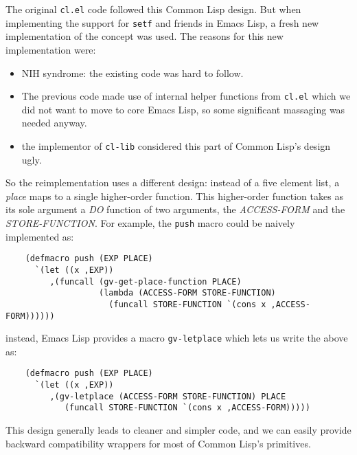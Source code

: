 \documentclass[format=acmsmall, review]{acmart}
\newcommand \Elisp {Emacs Lisp}
\begin{document}
The original \texttt{cl.el} code followed this Common Lisp design.  But when
implementing the support for \texttt{setf} and friends in \Elisp{}, a fresh
new implementation of the concept was used.  The reasons for this new
implementation were:
\begin{itemize}
\item NIH syndrome: the existing code was hard to follow.
\item The previous code made use of internal helper functions from
  \texttt{cl.el} which we did not want to move to core \Elisp, so some
  significant massaging was needed anyway.
\item the implementor of \texttt{cl-lib} considered this part of Common Lisp's
  design ugly.
\end{itemize}
So the reimplementation uses a different design: instead of a five element
list, a \emph{place} maps to a single higher-order function.
This higher-order function takes as its sole argument a \textsl{DO} function
of two arguments, the \textsl{ACCESS-FORM} and the \textsl{STORE-FUNCTION}.
For example, the \texttt{push} macro could be naively implemented as:
\begin{verbatim}
    (defmacro push (EXP PLACE)
      `(let ((x ,EXP))
         ,(funcall (gv-get-place-function PLACE)
                   (lambda (ACCESS-FORM STORE-FUNCTION)
                     (funcall STORE-FUNCTION `(cons x ,ACCESS-FORM))))))
\end{verbatim}
instead, \Elisp{} provides a macro \texttt{gv-letplace} which lets us
write the above as:
\begin{verbatim}
    (defmacro push (EXP PLACE)
      `(let ((x ,EXP))
         ,(gv-letplace (ACCESS-FORM STORE-FUNCTION) PLACE
            (funcall STORE-FUNCTION `(cons x ,ACCESS-FORM)))))
\end{verbatim}
This design generally leads to cleaner and simpler code, and we can easily
provide backward compatibility wrappers for most of Common Lisp's
primitives.
\end{document}
